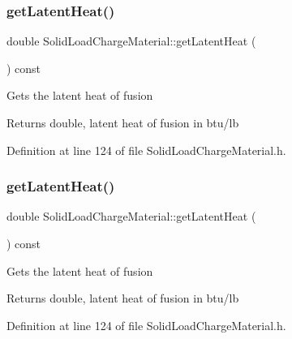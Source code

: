 \subsubsection{\texorpdfstring{get\+Latent\+Heat()}{getLatentHeat()}\hspace{0.1cm}{\footnotesize\ttfamily [2/3]}}
{\footnotesize\ttfamily double Solid\+Load\+Charge\+Material\+::get\+Latent\+Heat (\begin{DoxyParamCaption}{ }\end{DoxyParamCaption}) const\hspace{0.3cm}{\ttfamily [inline]}}

Gets the latent heat of fusion \begin{DoxyReturn}{Returns}
double, latent heat of fusion in btu/lb 
\end{DoxyReturn}


Definition at line 124 of file Solid\+Load\+Charge\+Material.\+h.

\mbox{\label{class_solid_load_charge_material_add60191bd282a9cefa4bf7a60301711b}} 
\subsubsection{\texorpdfstring{get\+Latent\+Heat()}{getLatentHeat()}\hspace{0.1cm}{\footnotesize\ttfamily [3/3]}}
{\footnotesize\ttfamily double Solid\+Load\+Charge\+Material\+::get\+Latent\+Heat (\begin{DoxyParamCaption}{ }\end{DoxyParamCaption}) const\hspace{0.3cm}{\ttfamily [inline]}}

Gets the latent heat of fusion \begin{DoxyReturn}{Returns}
double, latent heat of fusion in btu/lb 
\end{DoxyReturn}


Definition at line 124 of file Solid\+Load\+Charge\+Material.\+h.

\mbox{\label{class_solid_load_charge_material_a4be001f6e6ecbd2ad0ae1d154559cdb0}} 
